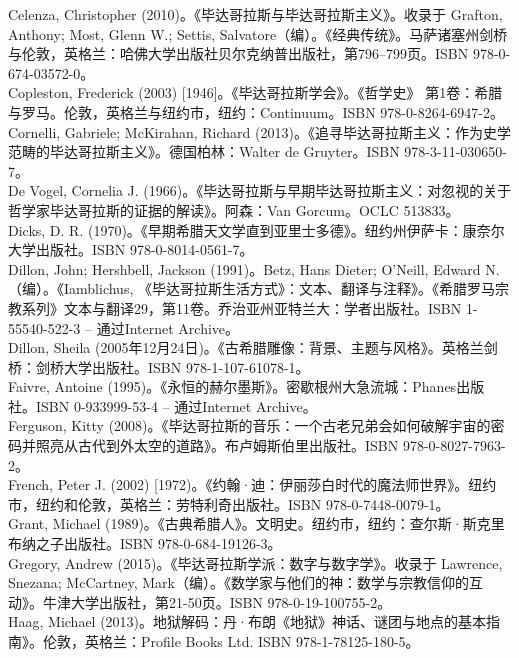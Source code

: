 Celenza, Christopher (2010)。《毕达哥拉斯与毕达哥拉斯主义》。收录于 Grafton, Anthony; Most, Glenn W.; Settis, Salvatore（编）。《经典传统》。马萨诸塞州剑桥与伦敦，英格兰：哈佛大学出版社贝尔克纳普出版社，第796–799页。ISBN 978-0-674-03572-0。\\  
Copleston, Frederick (2003) [1946]。《毕达哥拉斯学会》。《哲学史》 第1卷：希腊与罗马。伦敦，英格兰与纽约市，纽约：Continuum。ISBN 978-0-8264-6947-2。\\  
Cornelli, Gabriele; McKirahan, Richard (2013)。《追寻毕达哥拉斯主义：作为史学范畴的毕达哥拉斯主义》。德国柏林：Walter de Gruyter。ISBN 978-3-11-030650-7。\\  
De Vogel, Cornelia J. (1966)。《毕达哥拉斯与早期毕达哥拉斯主义：对忽视的关于哲学家毕达哥拉斯的证据的解读》。阿森：Van Gorcum。OCLC 513833。\\  
Dicks, D. R. (1970)。《早期希腊天文学直到亚里士多德》。纽约州伊萨卡：康奈尔大学出版社。ISBN 978-0-8014-0561-7。\\  
Dillon, John; Hershbell, Jackson (1991)。Betz, Hans Dieter; O'Neill, Edward N.（编）。《Iamblichus, 《毕达哥拉斯生活方式》：文本、翻译与注释》。《希腊罗马宗教系列》文本与翻译29，第11卷。乔治亚州亚特兰大：学者出版社。ISBN 1-55540-522-3 – 通过Internet Archive。\\  
Dillon, Sheila (2005年12月24日)。《古希腊雕像：背景、主题与风格》。英格兰剑桥：剑桥大学出版社。ISBN 978-1-107-61078-1。 \\ 
Faivre, Antoine (1995)。《永恒的赫尔墨斯》。密歇根州大急流城：Phanes出版社。ISBN 0-933999-53-4 – 通过Internet Archive。\\  
Ferguson, Kitty (2008)。《毕达哥拉斯的音乐：一个古老兄弟会如何破解宇宙的密码并照亮从古代到外太空的道路》。布卢姆斯伯里出版社。ISBN 978-0-8027-7963-2。\\  
French, Peter J. (2002) [1972)。《约翰·迪：伊丽莎白时代的魔法师世界》。纽约市，纽约和伦敦，英格兰：劳特利奇出版社。ISBN 978-0-7448-0079-1。\\  
Grant, Michael (1989)。《古典希腊人》。文明史。纽约市，纽约：查尔斯·斯克里布纳之子出版社。ISBN 978-0-684-19126-3。\\  
Gregory, Andrew (2015)。《毕达哥拉斯学派：数字与数字学》。收录于 Lawrence, Snezana; McCartney, Mark（编）。《数学家与他们的神：数学与宗教信仰的互动》。牛津大学出版社，第21-50页。ISBN 978-0-19-100755-2。\\  
Haag, Michael (2013)。地狱解码：丹·布朗《地狱》神话、谜团与地点的基本指南》。伦敦，英格兰：Profile Books Ltd. ISBN 978-1-78125-180-5。\\
